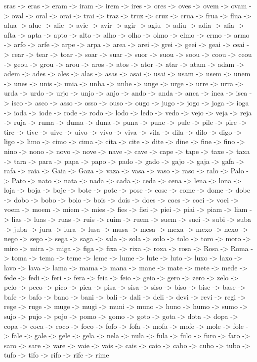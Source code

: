 \documentclass[a4paper,11pt]{article}
\begin{document}
sras -> eras -> eram -> iram -> irem -> ires -> ores -> oves -> ovem -> ovam -> oval -> oral -> orai -> trai -> traz -> truz -> cruz -> crua -> frua -> flua -> alua -> alue -> alie -> avie -> avir -> agir -> agiu -> adiu -> adia -> afia -> afta -> apta -> apto -> alto -> alho -> olho -> olmo -> elmo -> ermo -> armo -> arfo -> arfe -> arpe -> arpa -> area -> arei -> grei -> geei -> geai -> ceai -> cear -> tear -> toar -> soar -> suar -> suor -> suou -> soou -> coou -> ceou -> geou -> grou -> arou -> aros -> atos -> ator -> atar -> atam -> adam -> adem -> ades -> ales -> alas -> asas -> asai -> usai -> usam -> usem -> unem -> unes -> unis -> unia -> unha -> unhe -> unge -> urge -> urre -> urra -> urda -> urdo -> urjo -> unjo -> anjo -> ando -> anda -> anca -> inca -> isca -> isco -> asco -> asso -> osso -> ouso -> ougo -> jugo -> jogo -> joga -> ioga -> ioda -> iode -> rode -> rodo -> lodo -> ledo -> vedo -> vejo -> veja -> reja -> ruja -> ruma -> duma -> duna -> puna -> pune -> pule -> pile -> pire -> tire -> tive -> uive -> uivo -> vivo -> viva -> vila -> dila -> dilo -> digo -> ligo -> limo -> cimo -> cima -> cita -> cite -> dite -> dine -> fine -> fino -> nino -> nono -> novo -> nove -> nave -> cave -> cape -> tape -> taxe -> taxa -> tara -> para -> papa -> papo -> pado -> gado -> gajo -> gaja -> gafa -> rafa -> raia -> Gaia -> Gaza -> vaza -> vasa -> vaso -> raso -> ralo -> Palo -> Pato -> nato -> nata -> nada -> cada -> ceda -> cena -> lena -> lona -> loja -> boja -> boje -> bote -> pote -> pose -> cose -> come -> dome -> dobe -> dobo -> bobo -> boio -> bois -> dois -> does -> coes -> coei -> voei -> voem -> moem -> miem -> mies -> fies -> fiei -> piei -> piai -> piam -> liam -> lias -> luas -> ruas -> ruis -> ruim -> ruem -> suem -> suei -> subi -> suba -> juba -> jura -> lura -> lusa -> musa -> mesa -> mexa -> mexo -> nexo -> nego -> sego -> sega -> saga -> sala -> sola -> solo -> tolo -> toro -> moro -> miro -> mira -> miga -> figa -> fixa -> rixa -> roxa -> rosa -> Rosa -> Roma -> toma -> tema -> teme -> leme -> lume -> lute -> luto -> luxo -> laxo -> lavo -> lava -> lama -> mama -> mana -> mane -> mate -> mete -> mede -> fede -> fedi -> feri -> fera -> feia -> feio -> geio -> gero -> zero -> zelo -> pelo -> peco -> pico -> pica -> pisa -> sisa -> siso -> biso -> bise -> base -> bafe -> bafo -> bano -> bani -> bali -> dali -> deli -> devi -> revi -> regi -> rege -> ruge -> muge -> mugi -> muni -> muno -> huno -> humo -> sumo -> sujo -> pujo -> pojo -> pomo -> gomo -> goto -> gota -> dota -> dopa -> copa -> coca -> coco -> foco -> fofo -> fofa -> mofa -> mofe -> mole -> fole -> fale -> gale -> gele -> gela -> nela -> nula -> fula -> fulo -> furo -> faro -> saro -> sare -> vare -> vaie -> vais -> cais -> caio -> cabo -> cubo -> tubo -> tufo -> tifo -> rifo -> rife -> rime
\end{document}
